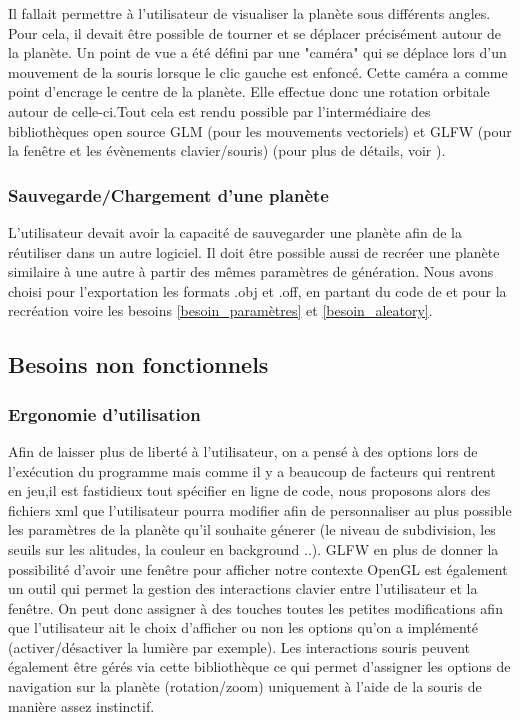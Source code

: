 \documentclass[a4paper]{article}
\begin{document}
Il fallait permettre à l’utilisateur de visualiser la planète sous différents angles. Pour cela, il devait être possible de tourner et se déplacer  précisément autour de la planète. Un point de vue a été défini par une "caméra" qui se déplace lors d’un mouvement de la souris lorsque le clic gauche est enfoncé. Cette caméra a comme point d’encrage le centre de la planète. Elle effectue donc une rotation orbitale autour de celle-ci.Tout cela est rendu possible par l’intermédiaire des bibliothèques open source GLM (pour les mouvements vectoriels) %
et GLFW (pour la fenêtre et les évènements clavier/souris) (pour plus de détails, voir \cite{TutoCamera}).

\subsubsection{Sauvegarde/Chargement d'une planète}

L’utilisateur devait avoir la capacité de sauvegarder une planète afin de la réutiliser dans un autre logiciel. Il doit être possible aussi de recréer une planète similaire à une autre à partir des mêmes paramètres de génération. Nous avons choisi pour l'exportation les formats .obj et .off, en partant du code de \cite{TD_3D} et pour la recréation voire les besoins \ref{besoin_paramètres} et \ref{besoin_aleatory}.

\subsection{Besoins non fonctionnels}


\subsubsection{Ergonomie d'utilisation}
Afin de laisser plus de liberté à l'utilisateur, on a pensé à des options lors de l'exécution du programme mais comme il y a beaucoup de facteurs qui rentrent en jeu,il est fastidieux tout spécifier en ligne de code, nous proposons alors des fichiers xml que l'utilisateur pourra modifier afin de personnaliser au plus possible les paramètres de la planète qu'il souhaite génerer (le niveau de subdivision, les seuils sur les alitudes, la couleur en background ..).
GLFW en plus de donner la possibilité d'avoir une fenêtre pour afficher notre contexte OpenGL est également un outil qui permet  la gestion des interactions clavier entre l'utilisateur et la fenêtre. On peut donc assigner à des touches toutes les petites modifications afin que l'utilisateur ait le choix d'afficher ou non les options qu'on a implémenté (activer/désactiver la lumière par exemple). Les interactions souris peuvent également être gérés via cette bibliothèque ce qui permet d'assigner les options de navigation sur la planète (rotation/zoom) uniquement à l'aide de la souris de manière assez instinctif.
\end{document}
